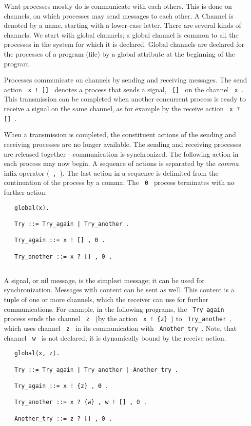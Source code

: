 What processes mostly do is communicate with each others. This is done
on channels, on which processes may send messages to each
other. A Channel is denoted by a name, starting with a lower-case
letter.  There are several kinds of channels. We start with global
channels; a global channel is common to all the processes in the system
for which it is declared. Global channels are declared for the
processes of a program (file) by a global attribute at the beginning
of the program.

Processes communicate on channels by sending and receiving
messages. The send action \verb+ x ! [] + denotes a process that
sends a signal, \verb+ [] + on the channel \verb+ x +. This
transmission can be completed when another concurrent process is ready
to receive a signal on the same channel, as for example by the receive
action \verb+ x ? [] +.

When a transmission is completed, the constituent actions of the
sending and receiving processes are no longer available.
The sending and receiving processes are released together -
communication is synchronized.  The following action in each process
may now begin.  A sequence of actions is separated by the {\em comma}
infix operator (\verb+ , +).  The last action in a sequence is
delimited from the continuation of the process by a comma.
The \verb+ 0 + process terminates with no further action.

\begin{verbatim}
   global(x).

   Try ::= Try_again | Try_another .

   Try_again ::= x ! [] , 0 .

   Try_another ::= x ? [] , 0 .
 
\end{verbatim}
 
A signal, or nil message, is the simplest message; it can be used
for synchronization. Messages with content can be sent as
well.  This content is a tuple of one or more channels, which the
receiver can use for further communications.  For example, in the
following programs, the \verb+ Try_again + process sends the channel
\verb+ z + (by the action \verb+ x ! {z} +) to \verb+ Try_another +,
which  uses channel  \verb+ z + in its communication with
\verb+ Another_try +.  Note, that channel \verb+ w + is not declared;
it is dynamically bound by the receive action.

\begin{verbatim}
   global(x, z).

   Try ::= Try_again | Try_another | Another_try .

   Try_again ::= x ! {z} , 0 .

   Try_another ::= x ? {w} , w ! [] , 0 .

   Another_try ::= z ? [] , 0 .
 
\end{verbatim}

